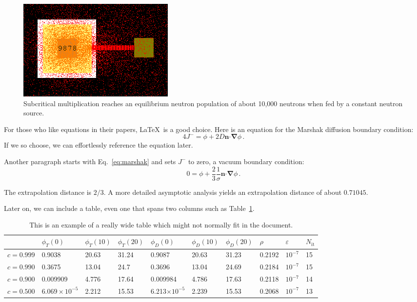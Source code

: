 \documentclass{anstrans}
\renewcommand{\vec}[1]{\bm{#1}} %
\newcommand{\vd}{\bm{\cdot}} %
\newcommand{\grad}{\vec{\nabla}} %
\begin{document}
\begin{figure}
    \centering
    \includegraphics{subcrit-mult-equil.png}
    \caption{Subcritical multiplication reaches an equilibrium neutron population of about 10,000 neutrons when fed by a constant neutron source.}
    \label{fig:subcrit-equil}
\end{figure}

For those who like equations in their papers, \LaTeX\ is a good choice. Here is
an equation for the Marshak diffusion boundary condition:
\begin{equation} \label{eq:marshak}
  4 J^- = \phi + 2 D \vec{n} \vd \grad \phi \,.
\end{equation}
If we so choose, we can effortlessly reference the equation later.

Another paragraph starts with Eq.~\eqref{eq:marshak} and sets $J^-$ to zero, a
vacuum boundary condition:
\begin{equation*}
  0 = \phi + \frac{2}{3} \frac{1}{\sigma} \vec{n} \vd \grad \phi \,.
\end{equation*}

The extrapolation distance is $2/3$. A more detailed asymptotic analysis yields
an extrapolation distance of about $0.71045$.

Later on, we can include a table, even one that spans two columns such as
Table~\ref{tab:widetable}.
\begin{table}[htb]
  \centering
\begin{tabular}{llllllllll}\toprule
      & $\phi_T(0)$      & $\phi_T(10)$      & $\phi_T(20)$      &
      $\phi_D(0)$      & $\phi_D(10)$      & $\phi_D(20)$      & $\rho$      &
      $\varepsilon$      & $N_\text{it}$
\\ \midrule
$c=0.999$  & 0.9038 & 20.63 & 31.24 & 0.9087 & 20.63 & 31.23 & 0.2192 & $10^{-7}$ & 15
\\
$c=0.990$  & 0.3675 & 13.04 & 24.7 & 0.3696 & 13.04 & 24.69 & 0.2184 & $10^{-7}$ & 15
\\
$c=0.900$  & 0.009909 & 4.776 & 17.64 & 0.009984 & 4.786 & 17.63 & 0.2118 & $10^{-7}$ & 14
\\
$c=0.500$  & $6.069\times 10^{-5}$ & 2.212 & 15.53 & 6.213$\times 10^{-5}$ & 2.239 & 15.53 & 0.2068 & $10^{-7}$ & 13
\\
\bottomrule
\end{tabular}
  \caption{This is an example of a really wide table which might not normally
  fit in the document.}
  \label{tab:widetable}
\end{table}
\end{document}
